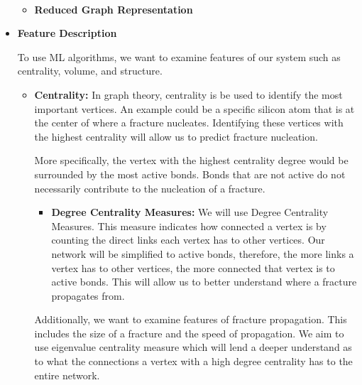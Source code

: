 \begin{itemize}
\begin{itemize}
\begin{tikzpicture}
    \end{tikzpicture}
    \bigskip
    \\

    \item \textbf{Reduced Graph Representation}
    \\
    
    
\end{itemize}


\item \textbf{Feature Description}
\bigskip

To use ML algorithms, we want to examine features of our system such as centrality, volume, and structure.

\begin{itemize}
    \item \textbf{Centrality:} In graph theory, centrality is be used to identify the most important vertices. An example could be a specific silicon atom that is at the center of where a fracture nucleates. Identifying these vertices with the highest centrality will allow us to predict fracture nucleation.
    
    \bigskip
    
    More specifically, the vertex with the highest centrality degree would be surrounded by the most active bonds. Bonds that are not active do not necessarily contribute to the nucleation of a fracture.
    
    \begin{itemize}
        \item \textbf{Degree Centrality Measures:} We will use Degree Centrality Measures. This measure indicates how connected a vertex is by counting the direct links each vertex has to other vertices. Our network will be simplified to active bonds, therefore, the more links a vertex has to other vertices, the more connected that vertex is to active bonds. This will allow us to better understand where a fracture propagates from. 
    \end{itemize}
    
    \bigskip
    
    Additionally, we want to examine features of fracture propagation. This includes the size of a fracture and the speed of propagation. We aim to use eigenvalue centrality measure which will lend a deeper understand as to what the connections a vertex with a high degree centrality has to the entire network.
    

\end{itemize}
\end{itemize}
